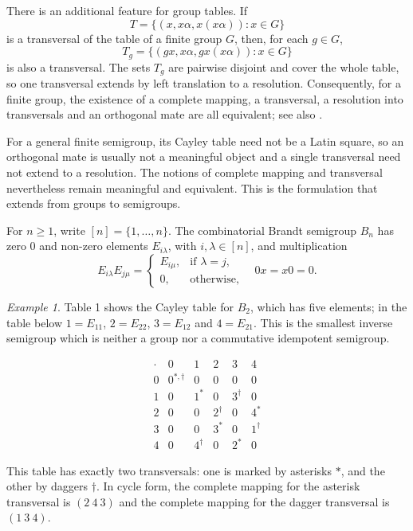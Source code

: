 \documentclass[11pt]{article}
\theoremstyle{plain}
\theoremstyle{remark}
\newtheorem{example}[theorem]{Example}
\theoremstyle{definition}
\theoremstyle{plain}
\begin{document}
There is an additional feature for group tables. If
\[
T=\{(x,x\alpha,x(x\alpha)):x\in G\}
\]
is a transversal of the table of a finite group $G$, then, for each $g\in G$,
\[
T_g=\{(gx,x\alpha,gx(x\alpha)):x\in G\}
\]
is also a transversal. The sets $T_g$ are pairwise disjoint and cover the
whole table, so one transversal extends by left translation to a resolution.
Consequently, for a finite group, the existence of a complete mapping, a
transversal, a resolution into transversals and an orthogonal mate are all
equivalent; see also \cite[Theorem~1.1]{VLW}.

For a general finite semigroup, its Cayley table need not be a Latin square,
so an orthogonal mate is usually not a meaningful object and a single
transversal need not extend to a resolution. The notions of complete mapping
and transversal nevertheless remain meaningful and equivalent. This is the
formulation that extends from groups to semigroups.
\endgroup
 
For $n\ge 1$, write $[n]=\{1,\ldots,n\}$. The combinatorial Brandt semigroup
$B_n$ has zero $0$ and non-zero elements $E_{i\lambda}$, with
$i,\lambda\in[n]$, and multiplication
\[
E_{i\lambda}E_{j\mu}=\begin{cases}
        E_{i\mu},&\text{if }\lambda=j,\\
        0,&\text{otherwise,}
        \end{cases}
        \quad
        0x=x0=0.
\]

\begin{example}\label{Ex:Brandt_transversals}
Table 1 shows the Cayley table for $B_2$, which has five elements; in the table below
$1=E_{11}$, $2=E_{22}$, $3=E_{12}$ and $4=E_{21}$. This is the smallest inverse
semigroup which is neither a group nor a commutative idempotent semigroup.
\begin{table}[htb]
\[
    \begin{array}{c|ccccc}
        \cdot & 0 & 1 & 2 & 3 & 4 \\
        \hline
        0 & 0^{\ast,\dagger} & 0 & 0 & 0 & 0 \\
        1 & 0 & 1^{\ast} & 0 & 3^{\dagger} & 0 \\
        2 & 0 & 0 & 2^{\dagger} & 0 & 4^{\ast} \\
        3 & 0 & 0 & 3^{\ast} & 0 & 1^{\dagger} \\
        4 & 0 & 4^{\dagger} & 0 & 2^{\ast} & 0
    \end{array}
\]
\caption{The Brandt semigroup $B_2$ with two transversals.}\label{brandt}
\end{table}

{\noindent This table has exactly two transversals: one is marked by asterisks $\ast$, and the other by daggers $\dagger$. In cycle form, the complete mapping for the asterisk transversal is $(2\ 4\ 3)$ and the complete mapping for the dagger transversal is $(1\ 3\ 4)$.}
\end{example}
\end{document}
